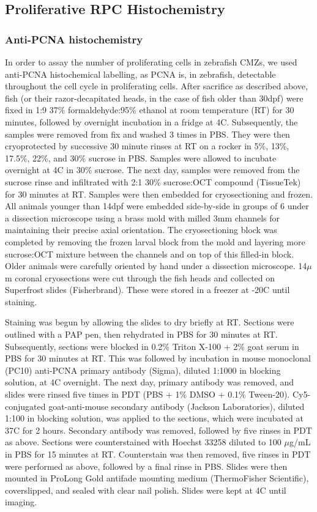 \documentclass{ut-thesis}
\begin{document}
\begin{NoHyper}
\subsection{Proliferative RPC Histochemistry}
\subsubsection{Anti-PCNA histochemistry}
\label{ssec:PCNA}
In order to assay the number of proliferating cells in zebrafish CMZs, we used anti-PCNA histochemical labelling, as PCNA is, in zebrafish, detectable throughout the cell cycle in proliferating cells. After sacrifice as described above, fish (or their razor-decapitated heads, in the case of fish older than 30dpf) were fixed in 1:9 37\% formaldehyde:95\% ethanol at room temperature (RT) for 30 minutes, followed by overnight incubation in a fridge at 4\textdegree C. Subsequently, the samples were removed from fix and washed 3 times in PBS. They were then cryoprotected by successive 30 minute rinses at RT on a rocker in 5\%, 13\%, 17.5\%, 22\%, and 30\% sucrose in PBS. Samples were allowed to incubate overnight at 4\textdegree C in 30\% sucrose. The next day, samples were removed from the sucrose rinse and infiltrated with 2:1 30\% sucrose:OCT compound (TissueTek) for 30 minutes at RT. Samples were then embedded for cryosectioning and frozen. All animals younger than 14dpf were embedded side-by-side in groups of 6 under a dissection microscope using a brass mold with milled 3mm channels for maintaining their precise axial orientation. The cryosectioning block was completed by removing the frozen larval block from the mold and layering more sucrose:OCT mixture between the channels and on top of this filled-in block. Older animals were carefully oriented by hand under a dissection microscope. 14$\mu$m coronal cryosections were cut through the fish heads and collected on Superfrost slides (Fisherbrand). These were stored in a freezer at -20\textdegree C until staining.

Staining was begun by allowing the slides to dry briefly at RT. Sections were outlined with a PAP pen, then rehydrated in PBS for 30 minutes at RT. Subsequently, sections were blocked in 0.2\% Triton X-100 + 2\% goat serum in PBS for 30 minutes at RT. This was followed by incubation in mouse monoclonal (PC10) anti-PCNA primary antibody (Sigma), diluted 1:1000 in blocking solution, at 4\textdegree C overnight. The next day, primary antibody was removed, and slides were rinsed five times in PDT (PBS + 1\% DMSO + 0.1\% Tween-20). Cy5-conjugated goat-anti-mouse secondary antibody (Jackson Laboratories), diluted 1:100 in blocking solution, was applied to the sections, which were incubated at 37\textdegree C for 2 hours. Secondary antibody was removed, followed by five rinses in PDT as above. Sections were counterstained with Hoechst 33258 diluted to 100 $\mu$g/mL in PBS for 15 minutes at RT. Counterstain was then removed, five rinses in PDT were performed as above, followed by a final rinse in PBS. Slides were then mounted in ProLong Gold antifade mounting medium (ThermoFisher Scientific), coverslipped, and sealed with clear nail polish. Slides were kept at 4\textdegree C until imaging.


\end{NoHyper}
\end{document}
